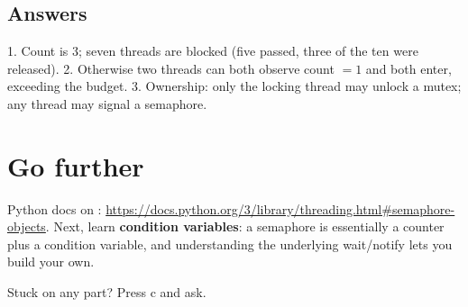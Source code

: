 \documentclass[11pt]{article}
\begin{document}
\subsection*{Answers}
\small
1. Count is 3; seven threads are blocked (five passed, three of the ten were released). 2. Otherwise two threads can both observe count $=1$ and both enter, exceeding the budget. 3. Ownership: only the locking thread may unlock a mutex; any thread may signal a semaphore.

\section{Go further}
Python docs on : \url{https://docs.python.org/3/library/threading.html\#semaphore-objects}. Next, learn \textbf{condition variables}: a semaphore is essentially a counter plus a condition variable, and understanding the underlying wait/notify lets you build your own.

Stuck on any part? Press c and ask.
\end{document}
